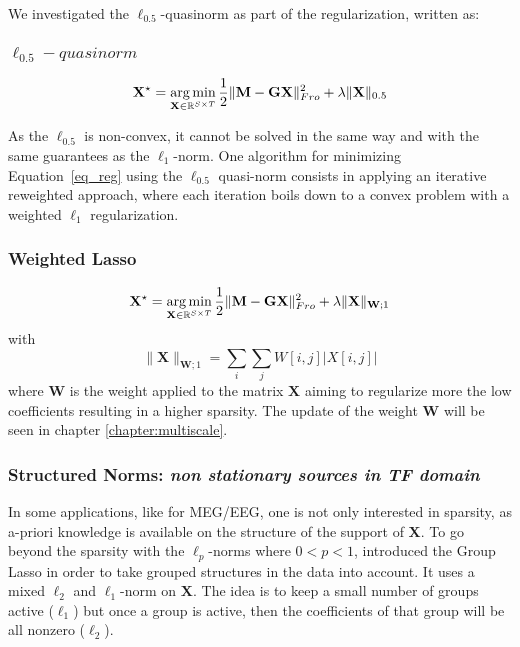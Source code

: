 We investigated the $\ell_{0.5}$-quasinorm as part of the regularization, written as:
\adjustwidth{1em}{0pt}
\subsubsection*{$\ell_{0.5}-quasinorm$}
\begin{equation} \label{eq_quasinorm}
	\mathbf{X}^\star = \mathop{\mathrm{arg}\,\mathrm{min}}_{\mathbf{X}\in\mathbb{R}^{S\times T}}\frac{1}{2}\|\mathbf{M}-\mathbf{GX}\|_{Fro}^2 + \lambda\|\mathbf{X}\|_{0.5}
\end{equation}
\endadjustwidth

As the $\ell_{0.5}$ is non-convex, it cannot be solved in the same way and with the same guarantees as the $\ell_1$-norm. One algorithm for minimizing Equation~\eqref{eq_reg} using the $\ell_{0.5}$ quasi-norm consists in applying an iterative reweighted approach, where each iteration boils down to a convex problem with a weighted $\ell_1$ regularization.
\adjustwidth{1em}{0pt}

\subsubsection*{Weighted Lasso}
\begin{equation} \label{eq_wlasso}
	\mathbf{X}^\star = \mathop{\mathrm{arg}\,\mathrm{min}}_{\mathbf{X}\in\mathbb{R}^{S\times T}}\frac{1}{2}\|\mathbf{M}-\mathbf{GX}\|_{Fro}^2 + \lambda\|\mathbf{X}\|_{\mathbf{W};1}
\end{equation}
with
\begin{equation*}
	\|\mathbf{X}\|_{\mathbf{W};1}=\sum_i\sum_j W[i,j]|X[i,j]|
\end{equation*}
where $\mathbf{W}$ is the weight applied to the matrix $\mathbf{X}$ aiming to regularize more the low coefficients resulting in a higher sparsity. The update of the weight $\mathbf{W}$ will be seen in chapter \ref{chapter:multiscale}.
\endadjustwidth

\subsubsection*{Structured Norms: \textit{non stationary sources in TF domain}}
In some applications, like for MEG/EEG, one is not only interested in sparsity, as a-priori knowledge is available on the structure of the support of $\mathbf{X}$. To go beyond the sparsity with the $\ell_p$-norms where $0<p<1$, \cite{yuan2006model} introduced the Group Lasso in order to take grouped structures  in the data into account. It uses a mixed $\ell_2$ and $\ell_1$-norm on $\mathbf{X}$. The idea is to keep a small number of groups active ($\ell_1$) but once a group is active, then the coefficients of that group will be all nonzero ($\ell_2$).
\adjustwidth{1em}{0pt}
\vspace{-10pt}
